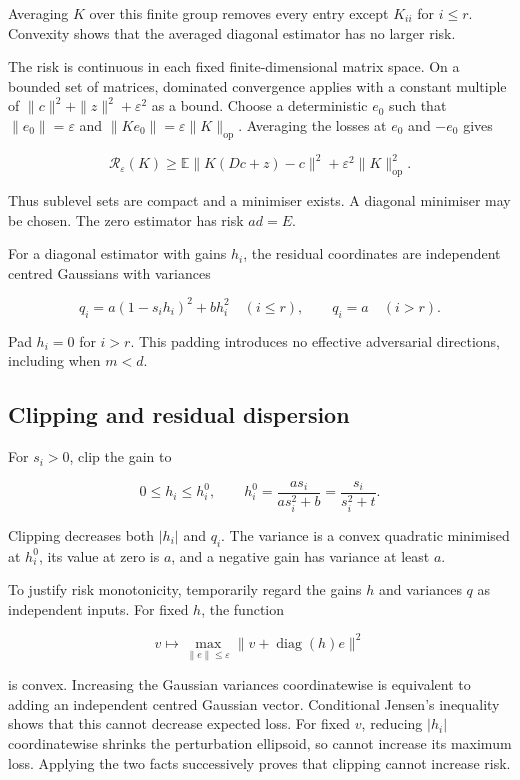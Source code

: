 \documentclass[11pt,a4paper]{article}
\begin{document}
Averaging \(K\) over this finite group removes every entry except
\(K_{ii}\) for \(i\le r\). Convexity shows that the averaged diagonal
estimator has no larger risk.

The risk is continuous in each fixed finite-dimensional matrix space. On
a bounded set of matrices, dominated convergence applies with a constant
multiple of \(\|c\|^2+\|z\|^2+\varepsilon^2\) as a bound. Choose a
deterministic \(e_0\) such that \(\|e_0\|=\varepsilon\) and
\(\|Ke_0\|=\varepsilon\|K\|_{\mathrm{op}}\). Averaging the losses at
\(e_0\) and \(-e_0\) gives

\[
\mathcal R_\varepsilon(K)\ge
\mathbb E\|K(Dc+z)-c\|^2
+\varepsilon^2\|K\|_{\mathrm{op}}^2.
\tag{9}
\]

Thus sublevel sets are compact and a minimiser exists. A diagonal
minimiser may be chosen. The zero estimator has risk \(ad=E\).

For a diagonal estimator with gains \(h_i\), the residual coordinates
are independent centred Gaussians with variances

\[
q_i=a(1-s_i h_i)^2+b h_i^2\quad(i\le r),\qquad
q_i=a\quad(i>r).
\tag{10}
\]

Pad \(h_i=0\) for \(i>r\). This padding introduces no effective
adversarial directions, including when \(m<d\).

\hypertarget{clipping-and-residual-dispersion}{%
\subsection{Clipping and residual
dispersion}\label{clipping-and-residual-dispersion}}

For \(s_i>0\), clip the gain to

\[
0\le h_i\le h_i^0,\qquad
h_i^0=\frac{a s_i}{a s_i^2+b}=\frac{s_i}{s_i^2+t}.
\tag{11}
\]

Clipping decreases both \(|h_i|\) and \(q_i\). The variance is a convex
quadratic minimised at \(h_i^0\), its value at zero is \(a\), and a
negative gain has variance at least \(a\).

To justify risk monotonicity, temporarily regard the gains \(h\) and
variances \(q\) as independent inputs. For fixed \(h\), the function

\[
v\longmapsto\max_{\|e\|\le\varepsilon}\|v+\operatorname{diag}(h)e\|^2
\]

is convex. Increasing the Gaussian variances coordinatewise is
equivalent to adding an independent centred Gaussian vector. Conditional
Jensen's inequality shows that this cannot decrease expected loss. For
fixed \(v\), reducing \(|h_i|\) coordinatewise shrinks the perturbation
ellipsoid, so cannot increase its maximum loss. Applying the two facts
successively proves that clipping cannot increase risk.
\end{document}
